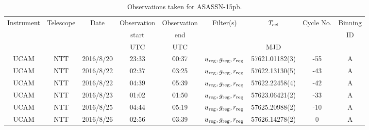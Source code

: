 \begin{table}
	\begin{center}
		\caption{Observations taken for ASASSN-15pb.}
		\label{table:observing:observation logs ASASSN-15pb}
		\begin{tabular}{ccccccccc}
			\hline
			Instrument & Telescope & Date & Observation  & Observation  & Filter(s) & $T_{\rm ecl}$ & Cycle No. & Binning \\
			 &  &  &  start &  end &  &  &  & ID \\
			 &  &  & UTC & UTC &  & MJD &  &  \\
			\hline
			\hline
			UCAM & NTT & 2016/8/20 & 23:33 & 00:37 & $u_{\rm reg},g_{\rm reg},r_{\rm reg}$ & 57621.01182(3) & -55 & A \\
			UCAM & NTT & 2016/8/22 & 02:37 & 03:25 & $u_{\rm reg},g_{\rm reg},r_{\rm reg}$ & 57622.13130(5) & -43 & A \\
			UCAM & NTT & 2016/8/22 & 04:39 & 05:39 & $u_{\rm reg},g_{\rm reg},r_{\rm reg}$ & 57622.22458(4) & -42 & A \\
			UCAM & NTT & 2016/8/23 & 01:02 & 01:50 & $u_{\rm reg},g_{\rm reg},r_{\rm reg}$ & 57623.06421(2) & -33 & A \\
			UCAM & NTT & 2016/8/25 & 04:44 & 05:19 & $u_{\rm reg},g_{\rm reg},r_{\rm reg}$ & 57625.20988(2) & -10 & A \\
			UCAM & NTT & 2016/8/26 & 02:56 & 03:39 & $u_{\rm reg},g_{\rm reg},r_{\rm reg}$ & 57626.14278(2) &   0 & A \\
		   \hline
		\end{tabular}
	\end{center}
\end{table}